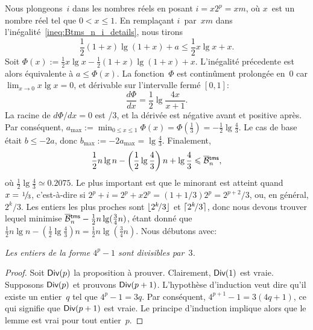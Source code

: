Nous plongeons~\(i\) dans les nombres réels en posant \(i=x2^p=xm\),
où \(x\)~est un nombre réel tel que \(0 < x \leqslant 1\). En
remplaçant \(i\)~par~\(xm\) dans
l'inégalité~\eqref{ineq:Btms_n_i_details}, nous tirons
\begin{equation*}
\frac{1}{2}(1+x)\lg(1+x) + a \leqslant \frac{1}{2}x\lg x + x.
\end{equation*}
Soit \(\Phi(x) := \tfrac{1}{2}x\lg x - \tfrac{1}{2}(1+x)\lg(1+x) +
x\). L'inégalité précedente est alors équivalente à \(a \leqslant
\Phi(x)\). La fonction~\(\Phi\) est continûment prolongée en~\(0\) car
\(\lim_{x \to 0} x\lg x = 0\), et dérivable sur l'intervalle
fermé \([0,1]\):
\begin{equation}
\frac{d\Phi}{dx} = \frac{1}{2}\lg\frac{4x}{x+1}.
\label{eq:der_Phi}
\end{equation}
La racine de \(d\Phi/dx = 0\) est /{3}, et la dérivée est
négative avant et positive après. Par conséquent, \(a_{\max} :=
\min_{0 \leqslant x \leqslant 1}\Phi(x) = \Phi(\tfrac{1}{3}) =
-\tfrac{1}{2}\lg\tfrac{4}{3}\). Le cas de base était \(b \leqslant
-2a\), donc \(b_{\max} := -2a_{\max} = \lg\tfrac{4}{3}\). Finalement,
\begin{equation}
  \frac{1}{2}n\lg n - \left(\frac{1}{2}\lg\frac{4}{3}\right)n + \lg\frac{4}{3}
  \leqslant \OB{\fun{tms}}{n},
\label{ineq:lower_Btms}
\end{equation}
où \(\tfrac{1}{2}\lg\tfrac{4}{3} \simeq 0.2075\). Le plus important
est que le minorant est atteint quand \(x=\myfrac{1}/{3}\),
c'est-à-dire si \(2^p+i=2^p+x2^p=(1+1/3)2^p=2^{p+2}\!/3\), ou, en
général, \(2^k\!/3\). Les entiers les plus proches sont
\(\lfloor{2^k\!/3}\rfloor\) et \(\lceil{2^k\!/3}\rceil\), donc nous devons trouver
lequel minimise \(\OB{\fun{tms}}{n} -
\tfrac{1}{2}n\lg(\tfrac{3}{4}n)\), étant donné que \(\tfrac{1}{2}n\lg
n - \left(\tfrac{1}{2}\lg\tfrac{4}{3}\right)n =
\tfrac{1}{2}n\lg(\tfrac{3}{4}n)\). Nous débutons avec:
\begin{lemma}
\label{lem_div3}
\textsl{Les entiers de la forme \(4^p-1\) sont divisibles par~\(3\).}
\end{lemma}
\begin{proof}
  Soit \(\textsf{Div}({p})\) la proposition à
  prouver. Clairement, \(\textsf{Div}({1})\) est vraie. Supposons
  \(\textsf{Div}({p})\) et prouvons \(\textsf{Div}({p+1})\). L'hypothèse
  d'induction veut dire qu'il existe un entier~\(q\) tel que \(4^p - 1
  = 3q\). Par conséquent, \(4^{p+1} - 1 = 3(4q+1)\), ce qui signifie
  que \(\textsf{Div}({p+1})\) est vraie. Le principe d'induction implique
  alors que le lemme est vrai pour tout entier~\(p\).
\end{proof}
